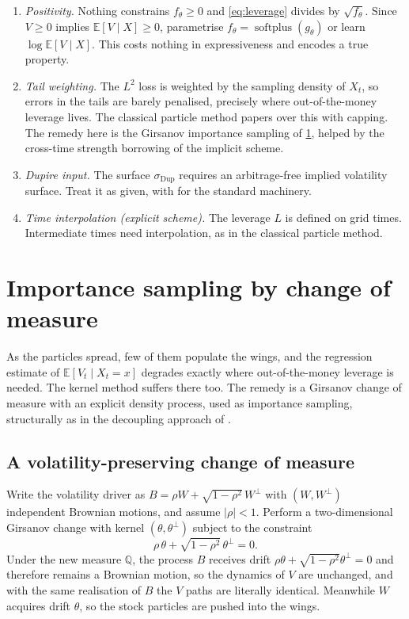 \documentclass[11pt,a4paper]{article}
\theoremstyle{plain}
\theoremstyle{definition}
\theoremstyle{definition}
\newcommand{\E}{\mathbb{E}}
\newcommand{\Qm}{\mathbb{Q}}
\newcommand{\abs}[1]{\left\lvert #1 \right\rvert}
\newcommand{\sigDup}{\sigma_{\mathrm{Dup}}}
\newcommand{\Lev}{L}
\begin{document}
\begin{enumerate}
\item \emph{Positivity.} Nothing constrains $f_\theta \geq 0$ and \cref{eq:leverage} divides by $\sqrt{f_\theta}$. Since $V \geq 0$ implies $\E[V \mid X] \geq 0$, parametrise $f_\theta = \operatorname{softplus}(g_\theta)$ or learn $\log \E[V \mid X]$. This costs nothing in expressiveness and encodes a true property.
\item \emph{Tail weighting.} The $L^2$ loss is weighted by the sampling density of $X_t$, so errors in the tails are barely penalised, precisely where out-of-the-money leverage lives. The classical particle method papers over this with capping. The remedy here is the Girsanov importance sampling of \cref{sec:girsanov}, helped by the cross-time strength borrowing of the implicit scheme.
\item \emph{Dupire input.} The surface $\sigDup$ requires an arbitrage-free implied volatility surface. Treat it as given, with \citep{chataigner2020} for the standard machinery.
\item \emph{Time interpolation (explicit scheme).} The leverage $\Lev$ is defined on grid times. Intermediate times need interpolation, as in the classical particle method.
\end{enumerate}

\section{Importance sampling by change of measure}\label{sec:girsanov}

As the particles spread, few of them populate the wings, and the regression estimate of $\E[V_t \mid X_t = x]$ degrades exactly where out-of-the-money leverage is needed. The kernel method suffers there too. The remedy is a Girsanov change of measure with an explicit density process, used as importance sampling, structurally as in the decoupling approach of \citet{dosreis2023}.

\subsection{A volatility-preserving change of measure}

Write the volatility driver as $B = \rho W + \sqrt{1-\rho^2}\, W^\perp$ with $(W, W^\perp)$ independent Brownian motions, and assume $\abs{\rho} < 1$. Perform a two-dimensional Girsanov change with kernel $(\theta, \theta^\perp)$ subject to the constraint
\begin{equation}\label{eq:constraint}
  \rho\,\theta + \sqrt{1-\rho^2}\,\theta^\perp = 0 .
\end{equation}
Under the new measure $\Qm$, the process $B$ receives drift $\rho\theta + \sqrt{1-\rho^2}\theta^\perp = 0$ and therefore remains a Brownian motion, so the dynamics of $V$ are unchanged, and with the same realisation of $B$ the $V$ paths are literally identical. Meanwhile $W$ acquires drift $\theta$, so the stock particles are pushed into the wings.
\end{document}
